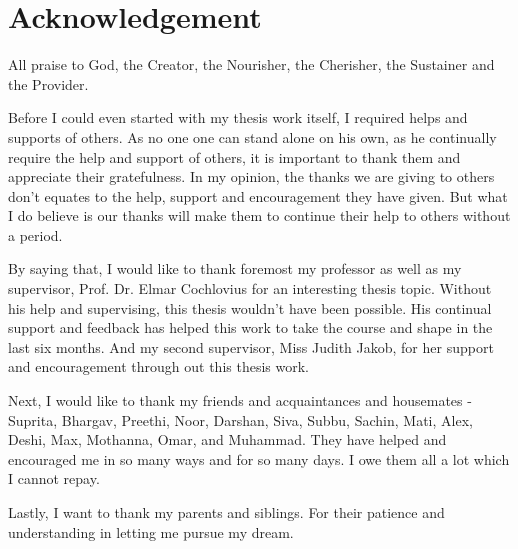 \chapter{Acknowledgement}

All praise to God, the Creator, the Nourisher, the Cherisher, the Sustainer and the Provider.

Before I could even started with my thesis work itself, I required helps and supports of others. As no one one can stand alone on his own, as he continually require the help and support of others, it is important to thank them and appreciate their gratefulness. In my opinion, the thanks we are giving to others don't equates to the help, support and encouragement they have given. But what I do believe is our thanks will make them to continue their help to others without a period.

By saying that, I would like to thank foremost my professor as well as my supervisor, Prof. Dr. Elmar Cochlovius for an interesting thesis topic. Without his help and supervising, this thesis wouldn't have been possible. His continual support and feedback has helped this work to take the course and shape in the last six months. And my second supervisor, Miss Judith Jakob, for her support and encouragement through out this thesis work.

Next, I would like to thank my friends and acquaintances and housemates - Suprita, Bhargav, Preethi, Noor, Darshan, Siva, Subbu, Sachin, Mati, Alex, Deshi, Max, Mothanna, Omar, and Muhammad. They have helped and encouraged me in so many ways and for so many days. I owe them all a lot which I cannot repay. 

Lastly, I want to thank my parents and siblings. For their patience and understanding in letting me pursue my dream.